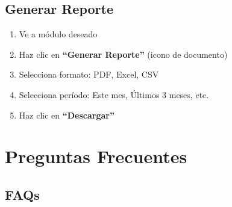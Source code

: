 \documentclass[12pt,a4paper,spanish,oneside]{report}
\begin{document}
\section{Generar Reporte}

\begin{enumerate}
    \item Ve a módulo deseado
    \item Haz clic en \textbf{``Generar Reporte''} (icono de documento)
    \item Selecciona formato: PDF, Excel, CSV
    \item Selecciona período: Este mes, Últimos 3 meses, etc.
    \item Haz clic en \textbf{``Descargar''}
\end{enumerate}

\chapter{Preguntas Frecuentes}

\section{FAQs}
\end{document}
